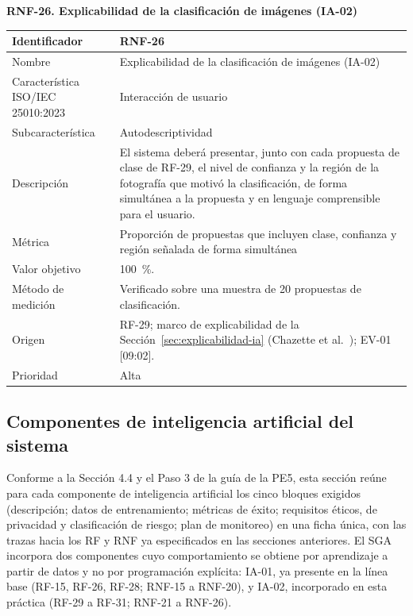 \documentclass[12pt,a4paper]{article}
\begin{document}
\begin{minipage}{\linewidth}
\bigskip
\noindent\textbf{RNF-26. Explicabilidad de la clasificación de imágenes (IA-02)}
\label{tab:RNF-26}

\begin{center}
\begin{tabular}{|p{4.2cm}|p{10cm}|}
\hline
Identificador & RNF-26 \\
\hline
Nombre & Explicabilidad de la clasificación de imágenes (IA-02) \\
\hline
Característica ISO/IEC 25010:2023 & Interacción de usuario \\
\hline
Subcaracterística & Autodescriptividad \\
\hline
Descripción & El sistema deberá presentar, junto con cada propuesta de clase de RF-29, el nivel de confianza y la región de la fotografía que motivó la clasificación, de forma simultánea a la propuesta y en lenguaje comprensible para el usuario. \\
\hline
Métrica & Proporción de propuestas que incluyen clase, confianza y región señalada de forma simultánea \\
\hline
Valor objetivo & 100~\%. \\
\hline
Método de medición & Verificado sobre una muestra de 20 propuestas de clasificación. \\
\hline
Origen & RF-29; marco de explicabilidad de la Sección~\ref{sec:explicabilidad-ia} (Chazette et al.~\cite{chazette2020,chazette2021,chazette2022}); EV-01 [09:02]. \\
\hline
Prioridad & Alta \\
\hline
\end{tabular}
\end{center}
\end{minipage}

\subsection{Componentes de inteligencia artificial del sistema}
\label{sec:componentes-ia}

Conforme a la Sección 4.4 y el Paso 3 de la guía de la PE5, esta sección reúne para cada componente de inteligencia artificial los cinco bloques exigidos (descripción; datos de entrenamiento; métricas de éxito; requisitos éticos, de privacidad y clasificación de riesgo; plan de monitoreo) en una ficha única, con las trazas hacia los RF y RNF ya especificados en las secciones anteriores. El SGA incorpora dos componentes cuyo comportamiento se obtiene por aprendizaje a partir de datos y no por programación explícita: IA-01, ya presente en la línea base (RF-15, RF-26, RF-28; RNF-15 a RNF-20), y IA-02, incorporado en esta práctica (RF-29 a RF-31; RNF-21 a RNF-26).
\end{document}
